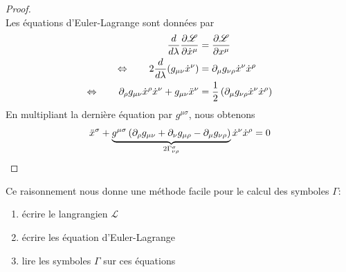 \documentclass[a4paper,11pt]{report}
\begin{document}
            \begin{proof}${}$\\
                Les équations d'Euler-Lagrange sont données par
                \begin{align}
                    \frac{d}{d\lambda}\pdv{\mathscr{L}}{\dot{x}^\mu} &= \pdv{\mathscr{L}}{x^\mu}\\
                    \Leftrightarrow\qquad 2\frac{d}{d\lambda}(g_{\mu\nu}\dot{x}^\nu) &= \partial_\mu g_{\nu\rho}\dot{x}^\nu\dot{x}^\rho\\
                    \Leftrightarrow\qquad \partial_\rho g_{\mu\nu}\dot{x}^\rho\dot{x}^\nu + g_{\mu\nu}\ddot{x}^\nu &= \frac{1}{2}\left( \partial_\mu g_{\nu\rho}\dot{x}^\nu\dot{x}^\rho \right)
                \end{align}
                En multipliant la dernière équation par $g^{\mu\sigma}$, nous obtenons
                \begin{equation}
                    \ddot{x}^\sigma + \underbrace{g^{\mu\sigma}\left( \partial_\rho g_{\mu\nu}+\partial_\nu g_{\mu\rho} - \partial_\mu g_{\nu\rho} \right)}_{2\Gamma^\sigma_{\nu\rho}}\dot{x}^\nu\dot{x}^\rho = 0\label{eq:calculgamma}
                \end{equation}
            \end{proof}
            
            Ce raisonnement nous donne une méthode facile pour le calcul des symboles $\Gamma$:
            \begin{enumerate}
                \item écrire le langrangien $\mathscr{L}$
                \item écrire les équation d'Euler-Lagrange
                \item lire les symboles $\Gamma$ sur ces équations
            \end{enumerate}
            
\end{document}
